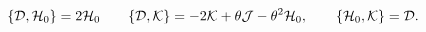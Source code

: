 \begin{equation}
	\{{\cal D},{\cal H}_{0}\}=2{\cal H}_{0}
	\qquad
	\{{\cal D},{\cal K}\}=-2{\cal K}+\theta{\cal J}-\theta^2{\cal H}_{0},
	\qquad
	\{{\cal H}_{0},{\cal K}\}={\cal D}.
\label{ncconfrel}
\end{equation}

